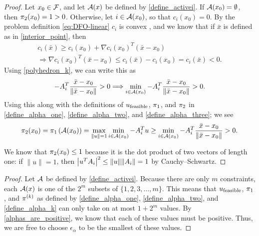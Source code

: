 \pagebreak
\begin{proof}

Let $x_0 \in {\mathcal F}$, and let ${\mathcal A}(x)$ be defined by \cref{define_activei}.
If ${\mathcal A}(x_0) = \emptyset$, then $\pi_2(x_0) = 1 > 0$.
Otherwise, let $i \in {\mathcal A}(x_0)$, so that $c_i(x_0) = 0$.
By the  problem definition \cref{eq:DFO-linear} $c_i$ is convex , and we know that if $\bar x$ is defined as in \cref{interior_point}, then
\begin{align*}
c_i(\bar x) \ge c_i(x_0) + \nabla c_i(x_0)^T(\bar x - x_0) \\
\Longrightarrow \nabla c_i(x_0)^T(\bar x - x_0) \le c_i(\bar x) - c_i(x_0) = c_i(\bar x) < 0.
\end{align*}
Using \cref{polyhedron_k}, we can write this as
\begin{align*}
-{{A}}^T_i\frac {\bar x - x_0}{\|\bar x - x_0\|} > 0  \Longrightarrow \min_{i \in {\mathcal A}(x_0)} -{{A}}_i^T\frac {\bar x - x_0}{\|\bar x - x_0\|} > 0.
\end{align*}
Using this along with the definitions of ${u_{\textrm{feasible}}}$, ${\pi_1}$, and $\pi_2$ in \cref{define_alpha_one}, \cref{define_alpha_two}, and \cref{define_alpha_three}; we see
\begin{align*}
\pi_2(x_0) = {\pi_1}\left({\mathcal A}(x_0)\right) = \max_{\|u\| = 1} \min_{i \in {\mathcal A}(x_0)} -{{A}}_i^Tu
\ge \min_{i \in {\mathcal A}(x_0)} - {{A}}_i^T\frac {\bar x - x_0}{\|\bar x - x_0\|} > 0.
\end{align*}

We know that $\pi_2(x_0) \le 1$ because it is the dot product of two vectors of length one:
if $\|u\| = 1$, then $\left|u^T {{A}}_i\right|^2 \le \|u\|\|{{A}}_i\| = 1$ by Cauchy–Schwartz.

\end{proof}

\begin{proof}

Let ${\mathcal A}$ be defined by \cref{define_activei}.
Because there are only $m$ constraints, each ${\mathcal A}(x)$ is one of the $2^m$ subsets of  $\{1, 2, 3, \ldots, m\}$.
This means that ${u_{\textrm{feasible}}}$, ${\pi_1}$, and $\pi^{(k)}$ as defined by \cref{define_alpha_one}, \cref{define_alpha_two}, and \cref{define_alpha_k} can only take on at most $1 + 2^m$ values.
By \cref{alphas_are_positive}, we know that each of these values must be positive.
Thus, we are free to choose $\epsilon_{\alpha}$ to be the smallest of these values.
\end{proof}

